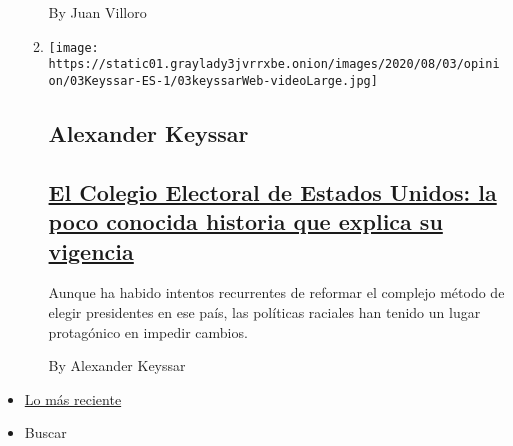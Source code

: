 \begin{enumerate}
\begin{enumerate}
    By Juan Villoro
  \item
    \texttt{[image: https://static01.graylady3jvrrxbe.onion/images/2020/08/03/opinion/03Keyssar-ES-1/03keyssarWeb-videoLarge.jpg]}

    \hypertarget{alexander-keyssar}{%
    \subsection{Alexander Keyssar}\label{alexander-keyssar}}

    \hypertarget{el-colegio-electoral-de-estados-unidos-la-poco-conocida-historia-que-explica-su-vigencia}{%
    \subsection{\texorpdfstring{\href{/es/2020/08/03/espanol/opinion/colegio-electoral-estados-unidos.html}{El
    Colegio Electoral de Estados Unidos: la poco conocida historia que
    explica su
    vigencia}}{El Colegio Electoral de Estados Unidos: la poco conocida historia que explica su vigencia}}\label{el-colegio-electoral-de-estados-unidos-la-poco-conocida-historia-que-explica-su-vigencia}}

    Aunque ha habido intentos recurrentes de reformar el complejo método
    de elegir presidentes en ese país, las políticas raciales han tenido
    un lugar protagónico en impedir cambios.

    By Alexander Keyssar
  \end{enumerate}
\end{enumerate}

\begin{itemize}
\tightlist
\item
  \protect\hyperlink{stream-panel}{Lo más reciente}
\item
  Buscar
\end{itemize}

